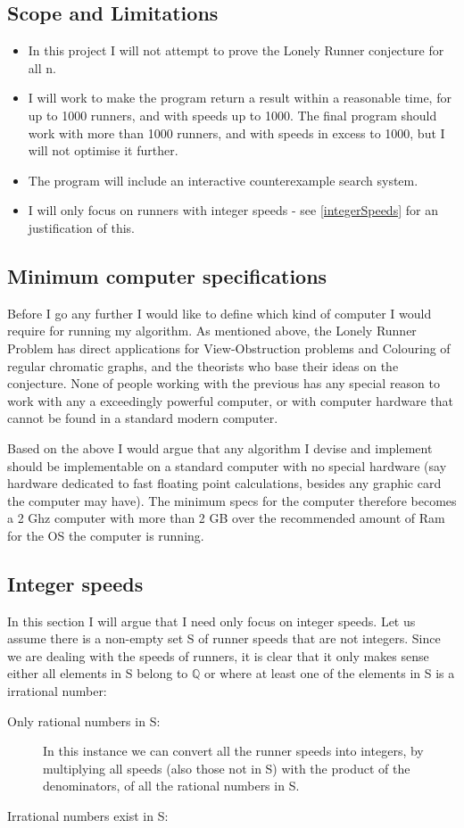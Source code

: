 \subsection{Scope and Limitations}
\label{scope}
\begin{itemize}
\item In this project I will not attempt to prove the Lonely Runner conjecture for all n. 
\item I will work to make the program return a result within a reasonable time, for up to 1000 runners, and with speeds up to 1000. The final program should work with more than 1000 runners, and with speeds in excess to 1000, but I will not optimise it further. 
\item The program will include an interactive counterexample search system.
\item I will only focus on runners with integer speeds - see \ref{integerSpeeds} for an justification of this.
\end{itemize}

\subsection{Minimum computer specifications}
\label{specs}
Before I go any further I would like to define which kind of computer I would require for running my algorithm. As mentioned above, the Lonely Runner Problem has direct applications for View-Obstruction problems and Colouring of regular chromatic graphs, and the theorists who base their ideas on the conjecture. None of people working with the previous has any special reason to work with any a exceedingly powerful computer, or with computer hardware that cannot be found in a standard modern computer.

 
Based on the above I would argue that any algorithm I devise and implement should be implementable on a standard computer with no special hardware (say hardware dedicated to fast floating point calculations, besides any graphic card the computer may have). The minimum specs for the computer therefore becomes a 2 Ghz computer with more than 2 GB over the recommended amount of Ram for the OS the computer is running. 


\subsection{Integer speeds}
In this section I will argue that I need only focus on integer speeds.
Let us assume there is a non-empty set S of runner speeds that are not integers. Since we are dealing with the speeds of runners, it is clear that it only makes sense either all elements in S belong to $\mathbb{Q}$ or where at least one of the elements in S is a irrational number:
\begin{description}
\item[Only rational numbers in S:] In this instance we can convert all the runner speeds into integers, by multiplying all speeds (also those not in S) with the product of the denominators, of all the rational numbers in S.
\item[Irrational numbers exist in S:]   
\end{description}

